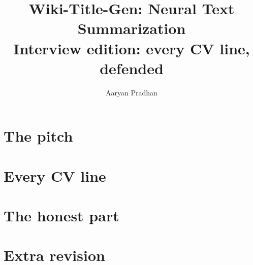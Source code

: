 \documentclass[11pt,oneside]{book}
\title{Wiki-Title-Gen: Neural Text Summarization\\[0.3em]\large Interview edition: every CV line, defended}
\author{Aaryan Pradhan}
\date{}
\begin{document}
\frontmatter
\maketitle
\tableofcontents


\mainmatter
\part{The pitch}


\part{Every CV line}




\part{The honest part}

\part{Extra revision}









\backmatter
\printindex
\end{document}
